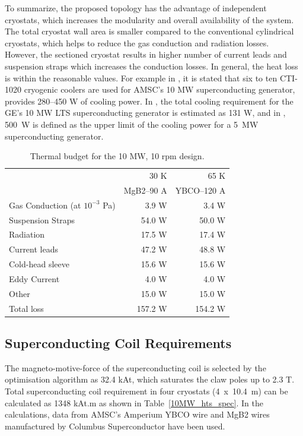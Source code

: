 \documentclass[12pt]{iopart}
\begin{document}
To summarize, the proposed topology has the advantage of independent cryostats, which increases the modularity and overall availability of the system. The total cryostat wall area is smaller compared to the conventional cylindrical cryostats, which helps to reduce the gas conduction and radiation losses. However, the sectioned cryostat results in higher number of current leads and suspension straps which increases the conduction losses. In general, the heat loss is within the reasonable values. For example in \cite{Snitchler2011}, it is stated that six to ten CTI-1020 cryogenic coolers are used for AMSC's 10 MW superconducting generator, provides 280--450 W of cooling power.
In \cite{Stautner2012}, the total cooling requirement for the GE's 10 MW LTS superconducting generator is estimated as 131 W, and in \cite{Abrahamsen2012}, 500~W is defined as the upper limit of the cooling power for a 5~MW superconducting generator.

\begin{table}
  \centering
  \begin{tabular}{lrr}
& 30 K & 65 K \\
& MgB2--90 A & YBCO--120 A \\
\hline
Gas Conduction (at $10^{-3}$ Pa) & 3.9 W & 3.4 W\\
Suspension Straps & 54.0 W & 50.0 W\\
Radiation & 17.5 W & 17.4 W\\
Current leads & 47.2 W & 48.8 W \\
Cold-head sleeve & 15.6 W & 15.6 W\\
Eddy Current & 4.0 W & 4.0 W\\
Other & 15.0 W & 15.0 W\\
\hline
Total loss & 157.2 W & 154.2 W\\
\hline
 \end{tabular}
  \caption{Thermal budget for the 10 MW, 10 rpm design. }
  \label{10MW_thermal_budget}
\end{table}

\subsection{Superconducting Coil Requirements}

The magneto-motive-force of the superconducting coil is selected by the optimisation algorithm as 32.4 kAt, which saturates the claw poles up to 2.3 T. Total superconducting coil requirement in four cryostats (4~x~10.4~m) can be calculated as 1348 kAt.m as shown in Table~\ref{10MW_hts_spec}. In the calculations, data from AMSC's Amperium YBCO wire \cite{AMSC2012} and MgB2 wires manufactured by Columbus Superconductor \cite{Modica2006} have been used.
\end{document}
